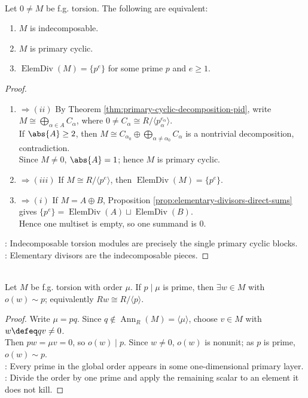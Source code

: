 \begin{theorem} \label{thm:indecomposable-fg-torsion-pid-modules} \\
Let $0\neq M$ be f.g. torsion. The following are equivalent:
\begin{enumerate}[label=(\roman*)]
\setlength{\itemsep}{0pt}
\item $M$ is indecomposable.
\item $M$ is primary cyclic.
\item $\operatorname{ElemDiv}(M)=\{p^e\}$ for some prime $p$ and $e\geq1$.
\end{enumerate}
\begin{proof}
\begin{enumerate}[label=(\roman*).]
\setlength{\itemsep}{0pt}
\item[$(i)$]$\Rightarrow (ii)$ By Theorem
\ref{thm:primary-cyclic-decomposition-pid}, write $M\cong\bigoplus_{\alpha\in A}C_\alpha$, where $0\neq C_\alpha\cong R/\langle p_\alpha^{e_\alpha}\rangle$.\\
If $\abs{A}\geq2$, then $M\cong C_{\alpha_0}\oplus\bigoplus_{\alpha\neq\alpha_0}C_\alpha$ is a nontrivial decomposition, contradiction.\\
Since $M\neq0$, $\abs{A}=1$; hence $M$ is primary cyclic.
\item[$(ii)$]$\Rightarrow (iii)$ If $M\cong R/\langle p^e\rangle$, then $\operatorname{ElemDiv}(M)=\{p^e\}$.
\item[$(iii)$]$\Rightarrow (i)$ If $M=A\oplus B$, Proposition \ref{prop:elementary-divisors-direct-sums} gives $\{p^e\}=\operatorname{ElemDiv}(A)\sqcup\operatorname{ElemDiv}(B)$.\\
Hence one multiset is empty, so one summand is $0$.
\end{enumerate}
: Indecomposable torsion modules are precisely the single primary cyclic blocks.\\
: Elementary divisors are the indecomposable pieces.
\end{proof}
\end{theorem}

\begin{proposition} \label{prop:prime-divisor-gives-prime-order-submodule} \\
Let $M$ be f.g. torsion with order $\mu$. If $p\mid\mu$ is prime, then $\exists w\in M$ with $o(w)\sim p$; equivalently $Rw\cong R/\langle p\rangle$.
\begin{proof} Write $\mu=pq$. Since $q\notin\operatorname{Ann}_R(M)=\langle\mu\rangle$, choose $v\in M$ with $w\defeq qv\neq0$.\\
Then $pw=\mu v=0$, so $o(w)\mid p$. Since $w\neq0$, $o(w)$ is nonunit; as $p$ is prime, $o(w)\sim p$.\\
: Every prime in the global order appears in some one-dimensional primary layer.\\
: Divide the order by one prime and apply the remaining scalar to an element it does not kill.
\end{proof}
\end{proposition}
